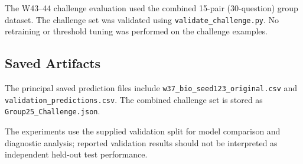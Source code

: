 \documentclass[11pt,a4paper,twocolumn]{article}
\begin{document}
The W43--44 challenge evaluation used the
combined 15-pair (30-question) group dataset.
The challenge set was validated using
\texttt{validate\_challenge.py}. No retraining
or threshold tuning was performed on the
challenge examples.

\subsection*{Saved Artifacts}
The principal saved prediction files include
\texttt{w37\_bio\_seed123\_original.csv} and
\texttt{validation\_predictions.csv}.
The combined challenge set is stored as
\texttt{Group25\_Challenge.json}.

The experiments use the supplied validation
split for model comparison and diagnostic
analysis; reported validation results should
not be interpreted as independent held-out
test performance.




\end{document}
